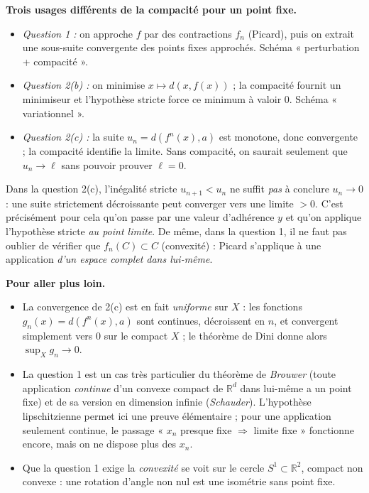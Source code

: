 \documentclass[11pt,a4paper]{article}
\newcommand{\R}{\mathbb{R}}
\theoremstyle{definition}
\begin{document}
\begin{pointcle}
\textbf{Trois usages différents de la compacité pour un point fixe.}
\begin{itemize}
  \item \emph{Question 1 :} on approche $f$ par des contractions $f_n$ (Picard), puis on extrait une sous-suite convergente des points fixes approchés. Schéma « perturbation + compacité ».
  \item \emph{Question 2(b) :} on minimise $x\mapsto d(x,f(x))$ ; la compacité fournit un minimiseur et l'hypothèse stricte force ce minimum à valoir $0$. Schéma « variationnel ».
  \item \emph{Question 2(c) :} la suite $u_n=d(f^n(x),a)$ est monotone, donc convergente ; la compacité identifie la limite. Sans compacité, on saurait seulement que $u_n\to\ell$ sans pouvoir prouver $\ell=0$.
\end{itemize}
\end{pointcle}

\begin{piege}
Dans la question 2(c), l'inégalité stricte $u_{n+1}<u_n$ ne suffit \emph{pas} à conclure $u_n\to0$ : une suite strictement décroissante peut converger vers une limite $>0$. C'est précisément pour cela qu'on passe par une valeur d'adhérence $y$ et qu'on applique l'hypothèse stricte \emph{au point limite}. De même, dans la question 1, il ne faut pas oublier de vérifier que $f_n(C)\subset C$ (convexité) : Picard s'applique à une application \emph{d'un espace complet dans lui-même}.
\end{piege}

\begin{commentaire}
\textbf{Pour aller plus loin.}
\begin{itemize}
  \item La convergence de 2(c) est en fait \emph{uniforme} sur $X$ : les fonctions $g_n(x)=d(f^n(x),a)$ sont continues, décroissent en $n$, et convergent simplement vers $0$ sur le compact $X$ ; le théorème de Dini donne alors $\sup_Xg_n\to0$.
  \item La question 1 est un cas très particulier du théorème de \emph{Brouwer} (toute application \emph{continue} d'un convexe compact de $\R^d$ dans lui-même a un point fixe) et de sa version en dimension infinie (\emph{Schauder}). L'hypothèse lipschitzienne permet ici une preuve élémentaire ; pour une application seulement continue, le passage « $x_n$ presque fixe $\Rightarrow$ limite fixe » fonctionne encore, mais on ne dispose plus des $x_n$.
  \item Que la question 1 exige la \emph{convexité} se voit sur le cercle $S^1\subset\R^2$, compact non convexe : une rotation d'angle non nul est une isométrie sans point fixe.
\end{itemize}
\end{commentaire}
\end{document}
